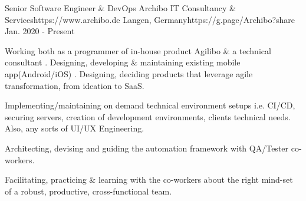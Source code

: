 

\begin{workentries}

\workentry
{Senior Software Engineer \& DevOps} %
{Archibo IT Consultancy \& Services}{https://www.archibo.de} %
{Langen, Germany}{https://g.page/Archibo?share} %
{Jan. 2020 - Present} %
    {
      \begin{workitems} %
        \item {Working both as a programmer of in-house product Agilibo \& a technical consultant
        . Designing, developing \& maintaining existing mobile app(Android/iOS)
        . Designing, deciding products that leverage agile transformation, from ideation to SaaS.}
        \item {Implementing/maintaining on demand technical environment setups i.e. CI/CD, securing servers, creation of development environments,
        clients technical needs. Also, any sorts of UI/UX Engineering.}
        \item {Architecting, devising and guiding the automation framework with QA/Tester co-workers.}
        \item {Facilitating, practicing \& learning with the co-workers about the right mind-set of a robust, productive, cross-functional team.}
      \end{workitems}
    }


\end{workentries}
